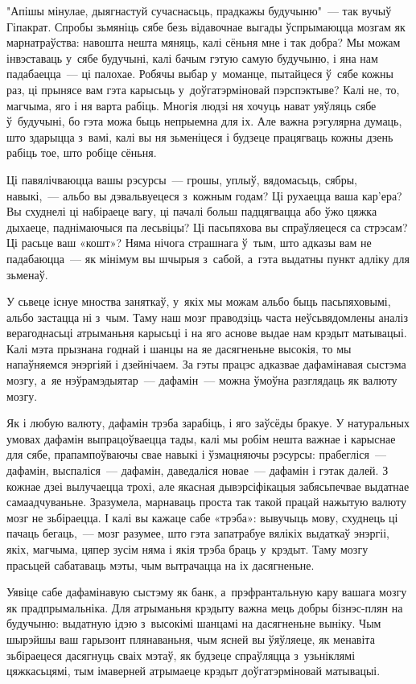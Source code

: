 "Апішы мінулае, дыягнастуй сучаснасьць, прадкажы будучыню"~--- так вучыў Гіпакрат. Спробы зьмяніць сябе безь відавочнае выгады ўспрымаюцца мозгам як марнатраўства: навошта нешта мяняць, калі сёньня мне і так добра? Мы можам інвэставаць у~сябе будучыні, калі бачым гэтую самую будучыню, і яна нам падабаецца~--- ці палохае. Робячы выбар у~моманце, пытайцеся ў~сябе кожны раз, ці прынясе вам гэта карысьць у~доўгатэрміновай пэрспэктыве? Калі не, то, магчыма, яго і ня варта рабіць. Многія людзі ня хочуць нават уяўляць сябе ў~будучыні, бо гэта можа быць непрыемна для іх. Але важна рэгулярна думаць, што здарыцца з~вамі, калі вы ня зьменіцеся і будзеце працягваць кожны дзень рабіць тое, што робіце сёньня.

Ці павялічваюцца вашы рэсурсы~--- грошы, уплыў, вядомасьць, сябры, навыкі,~--- альбо вы дэвальвуецеся з~кожным годам? Ці рухаецца ваша кар'ера? Вы схуднелі ці набіраеце вагу, ці пачалі больш падцягвацца або ўжо цяжка дыхаеце, паднімаючыся па лесьвіцы? Ці пасьпяхова вы спраўляецеся са стрэсам? Ці расьце ваш «кошт»? Няма нічога страшнага ў~тым, што адказы вам не падабаюцца~--- як мінімум вы шчырыя з~сабой, а~гэта выдатны пункт адліку для зьменаў.

У сьвеце існуе мноства заняткаў, у~якіх мы можам альбо быць пасьпяховымі, альбо застацца ні з~чым. Таму наш мозг праводзіць часта неўсьвядомлены аналіз верагоднасьці атрыманьня карысьці і на яго аснове выдае нам крэдыт матывацыі. Калі мэта прызнана годнай і шанцы на яе дасягненьне высокія, то мы напаўняемся энэргіяй і дзейнічаем. За гэты працэс адказвае дафамінавая сыстэма мозгу, а~яе нэўрамэдыятар~--- дафамін~--- можна ўмоўна разглядаць як валюту мозгу.

Як і любую валюту, дафамін трэба зарабіць, і яго заўсёды бракуе. У натуральных умовах дафамін выпрацоўваецца тады, калі мы робім нешта важнае і карыснае для сябе, прапампоўваючы свае навыкі і ўзмацняючы рэсурсы: прабегліся~--- дафамін, выспаліся~--- дафамін, даведаліся новае~--- дафамін і гэтак далей. З кожнае дзеі вылучаецца трохі, але якасная дывэрсіфікацыя забясьпечвае выдатнае самаадчуваньне. Зразумела, марнаваць проста так такой працай нажытую валюту мозг не зьбіраецца. І калі вы кажаце сабе «трэба»: вывучыць мову, схуднець ці пачаць бегаць,~--- мозг разумее, што гэта запатрабуе вялікіх выдаткаў энэргіі, якіх, магчыма, цяпер зусім няма і якія трэба браць у~крэдыт. Таму мозгу прасьцей сабатаваць мэты, чым вытрачацца на іх дасягненьне.

Уявіце сабе дафамінавую сыстэму як банк, а~прэфрантальную кару вашага мозгу як прадпрымальніка. Для атрыманьня крэдыту важна мець добры бізнэс-плян на будучыню: выдатную ідэю з~высокімі шанцамі на дасягненьне выніку. Чым шырэйшы ваш гарызонт плянаваньня, чым ясней вы ўяўляеце, як менавіта зьбіраецеся дасягнуць сваіх мэтаў, як будзеце спраўляцца з~узьніклямі цяжкасьцямі, тым імаверней атрымаеце крэдыт доўгатэрміновай матывацыі.

